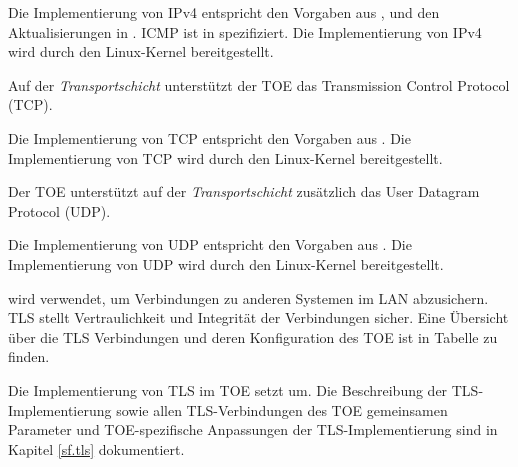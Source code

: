 

Die Implementierung von IPv4 entspricht den Vorgaben aus ,
 und den Aktualisierungen in . ICMP ist in
 spezifiziert. Die Implementierung von IPv4 wird durch den
Linux-Kernel bereitgestellt.



Auf der \emph{Transportschicht} unterstützt der TOE das Transmission
Control Protocol (TCP). 



Die Implementierung von TCP entspricht den Vorgaben aus
. Die Implementierung von TCP wird durch den Linux-Kernel
bereitgestellt.




Der TOE unterstützt auf der \emph{Transportschicht} zusätzlich das
User Datagram Protocol (UDP). 



Die Implementierung von UDP entspricht den Vorgaben aus
. Die Implementierung von UDP wird durch den Linux-Kernel
bereitgestellt.



\lslantls{} wird verwendet, um Verbindungen zu anderen Systemen im LAN
abzusichern. TLS stellt Vertraulichkeit und
Integrität der Verbindungen sicher. Eine Übersicht über die TLS
Verbindungen und deren Konfiguration des TOE ist in Tabelle
 zu finden. 



Die Implementierung von TLS im TOE setzt \autocite{rfc5246} um. Die Beschreibung
der TLS-Implementierung sowie allen TLS-Verbindungen des TOE gemeinsamen
Parameter und TOE-spezifische Anpassungen der TLS-Implementierung sind in
Kapitel \ref{sf.tls} dokumentiert.

